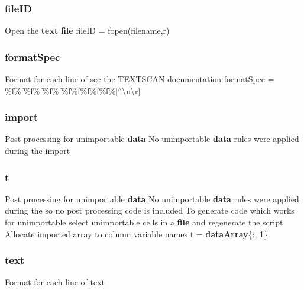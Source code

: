\subsubsection{file\+ID}
{\footnotesize\ttfamily Open the \textbf{ text} \textbf{ file} file\+ID = fopen(filename,\textquotesingle{}r\textquotesingle{})}

\mbox{\label{_import_log_8m_a25139a5820f7024a49a2f0aeb2077ea0}} 
\subsubsection{format\+Spec}
{\footnotesize\ttfamily Format for each line of see the T\+E\+X\+T\+S\+C\+AN documentation format\+Spec = \textquotesingle{}\%f\%f\%f\%f\%f\%f\%f\%f\%f\%f\%f\%[$^\wedge$\textbackslash{}n\textbackslash{}r]\textquotesingle{}}

\mbox{\label{_import_log_8m_a97736099a9ac43f989770145ce6b9935}} 
\subsubsection{import}
{\footnotesize\ttfamily Post processing for unimportable \textbf{ data} No unimportable \textbf{ data} rules were applied during the import}

\mbox{\label{_import_log_8m_a69071fd826a28729eeba030de35a2197}} 
\subsubsection{t}
{\footnotesize\ttfamily Post processing for unimportable \textbf{ data} No unimportable \textbf{ data} rules were applied during the so no post processing code is included To generate code which works for unimportable select unimportable cells in a \textbf{ file} and regenerate the script Allocate imported array to column variable names t = \textbf{ data\+Array}\{\+:, 1\}}

\mbox{\label{_import_log_8m_aa28ffc06f7e18deaf5dfae38932383c4}} 
\subsubsection{text}
{\footnotesize\ttfamily Format for each line of text}

